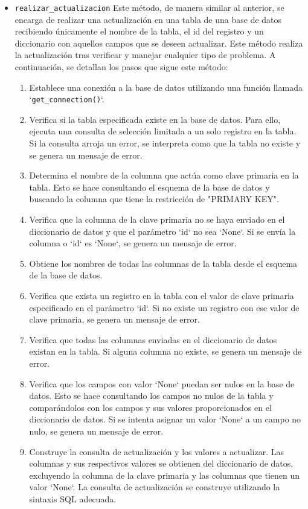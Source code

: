 \documentclass[12pt]{report}
\begin{document}
\begin{itemize}
\item \texttt{realizar\_actualizacion}
Este método, de manera similar al anterior, se encarga de realizar una actualización en una tabla de una base de datos recibiendo únicamente el nombre de la tabla, el id del registro y un diccionario con aquellos campos que se deseen actualizar. Este método realiza la actualización tras verificar y manejar cualquier tipo de problema. A continuación, se detallan los pasos que sigue este método:

\begin{enumerate}
    \item Establece una conexión a la base de datos utilizando una función llamada `\texttt{get\_connection()}`.
    \item Verifica si la tabla especificada existe en la base de datos. Para ello, ejecuta una consulta de selección limitada a un solo registro en la tabla. Si la consulta arroja un error, se interpreta como que la tabla no existe y se genera un mensaje de error.
    \item Determina el nombre de la columna que actúa como clave primaria en la tabla. Esto se hace consultando el esquema de la base de datos y buscando la columna que tiene la restricción de "PRIMARY KEY".
    \item Verifica que la columna de la clave primaria no se haya enviado en el diccionario de datos y que el parámetro `id` no sea `None`. Si se envía la columna o `id` es `None`, se genera un mensaje de error.
    \item Obtiene los nombres de todas las columnas de la tabla desde el esquema de la base de datos.
    \item Verifica que exista un registro en la tabla con el valor de clave primaria especificado en el parámetro `id`. Si no existe un registro con ese valor de clave primaria, se genera un mensaje de error.
    \item Verifica que todas las columnas enviadas en el diccionario de datos existan en la tabla. Si alguna columna no existe, se genera un mensaje de error.
    \item Verifica que los campos con valor `None` puedan ser nulos en la base de datos. Esto se hace consultando los campos no nulos de la tabla y comparándolos con los campos y sus valores proporcionados en el diccionario de datos. Si se intenta asignar un valor `None` a un campo no nulo, se genera un mensaje de error.
    \item Construye la consulta de actualización y los valores a actualizar. Las columnas y sus respectivos valores se obtienen del diccionario de datos, excluyendo la columna de la clave primaria y las columnas que tienen un valor `None`. La consulta de actualización se construye utilizando la sintaxis SQL adecuada.

\end{enumerate}
\end{itemize}
\end{document}
